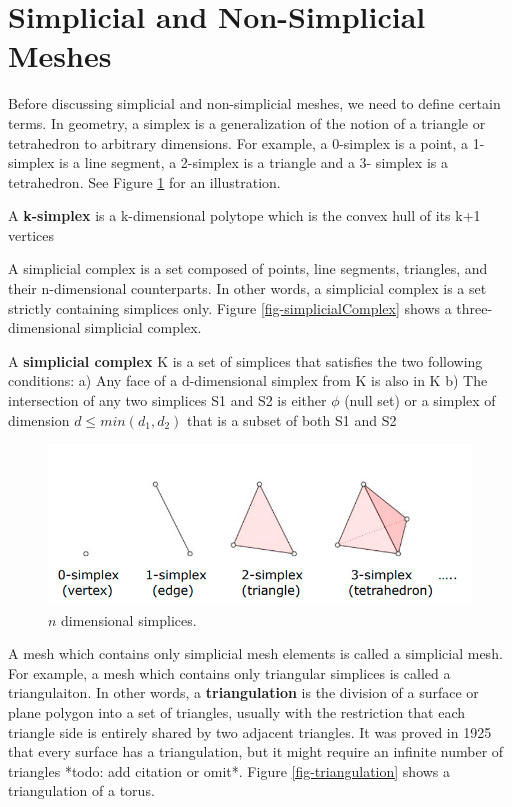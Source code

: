 \section{Simplicial and Non-Simplicial Meshes}
\label{sec-simplicial}

Before discussing simplicial and non-simplicial meshes, we need to define certain terms. In geometry, a simplex is a generalization of the notion of a triangle or tetrahedron to arbitrary dimensions. For example, a 0-simplex is a point, a 1-simplex is a line segment, a 2-simplex is a triangle and a 3- simplex is a tetrahedron. See Figure \ref{fig-simplices} for an illustration.

\begin{definition}
A \textbf{k-simplex} is a k-dimensional polytope which is the convex hull of its k+1 vertices
\end{definition}

A simplicial complex is a set composed of points, line segments, triangles, and their n-dimensional counterparts. In other words, a simplicial complex is a set strictly containing simplices only. Figure \ref{fig-simplicialComplex} shows a three-dimensional simplicial complex.

\begin{definition}
A \textbf{simplicial complex} K
is a set of simplices that
satisfies the two following
conditions:
a) Any face of a d-dimensional simplex
 from K is also in K
b) The intersection of any
 two simplices S1 and S2
 is either $\phi$ (null set) or a simplex of dimension $d \leq min(d_1, d_2)$ that is a subset of
 both S1 and S2
\end{definition}

\begin{figure}
	\centering
	\includegraphics[width=0.95\linewidth]{img/intro/simplices.png}
	\caption{$n$ dimensional simplices.}
	\label{fig-simplices}
\end{figure}

A mesh which contains only simplicial mesh elements is called a simplicial mesh. For example, a mesh which contains only triangular simplices is called a triangulaiton. In other words, a \textbf{triangulation} is the division of a surface or plane polygon into a set of triangles, usually with the restriction that each triangle side is entirely shared by two adjacent triangles. It was proved in 1925 that every surface has a triangulation, but it might require an infinite number of triangles *todo: add citation or omit*. Figure \ref{fig-triangulation} shows a triangulation of a torus.


